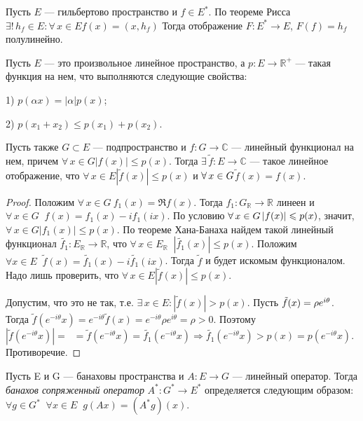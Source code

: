 \documentclass[10pt]{article}
\newcommand*{\p}[1]{#1\nobreak\discretionary{}{\hbox{$\mathsurround=0pt #1$}}{}}
\begin{document}
\begin{note}
Пусть $E$ --- гильбертово пространство и $f\in E^*$. По теореме
Рисса  $\exists!\,h_f\in E:\forall\,x\in E$\;\;$f(x)=(x,h_f)$ Тогда
отображение $F\colon E^*\rightarrow E$, $F(f)=h_f$ полулинейно.
\end{note}

\begin{theorem}
Пусть $E$ --- это произвольное линейное пространство, а $p\colon
E\to\mathbb{R}^+$ --- такая функция на нем, что выполняются
следующие свойства:

1\textup{)} $p(\alpha x)=|\alpha| p(x)$;

2\textup{)} $p(x_1+x_2)\leqslant p(x_1)+p(x_2)$.

Пусть также $G\subset E$ --- подпространство и $f\colon
G\to\mathbb{C}$ --- линейный функционал на нем, причем
$\forall\,x\in G$\;\;$|f(x)|\leqslant p(x)$. Тогда
$\exists\,\tilde{f}\colon E\to \mathbb{C}$ --- такое линейное
отображение, что $\forall\,x\in E$\;\;$|\tilde{f}(x)|\leqslant p(x)$
и $\forall\,x\p\in G$\;\;$\tilde{f}(x)=f(x)$.
\end{theorem}

\begin{proof}
Положим $\forall\, x\in G\ f_1(x)=\Re f(x)$. Тогда $f_1\colon
G_{\mathbb{R}}\rightarrow \mathbb{R}$ линеен и $\forall\, x \in
G\;\; f(x)=f_1(x)-if_1(ix)$. По условию $\forall\,x\p\in
G$\;\;$|f(x)|\p\leqslant p(x)$, значит, $\forall\,x\in
G$\;\;$|f_1(x)|\leqslant p(x)$. По теореме Хана-Банаха найдем такой
линейный функционал $\tilde{f_1}\colon E_{\mathbb{R}}\rightarrow
\mathbb{R}$, что $\forall\, x\in E_{\mathbb{R}}
\;\;|\tilde{f_1}(x)|\leqslant p(x)$. Положим $\forall x \in E\;\;
\tilde{f}(x)=\tilde{f_1}(x)-i\tilde{f_1}(ix)$. Тогда $\tilde{f}$ и
будет искомым функционалом. Надо лишь проверить, что $\forall\,x\in
E$\;\;$|\tilde{f}(x)|\leqslant p(x)$.

Допустим, что это не так, т.е. $\exists\, x\in E:
|\tilde{f}(x)|>p(x)$. Пусть $\tilde{f}(x)\p=\rho e^{i\theta}$. Тогда
$\tilde{f}(e^{-i\theta}x)=e^{-i\theta}\tilde{f}(x)=e^{-i\theta}\rho
e^{i\theta}=\rho>0$. Поэтому
$|\tilde{f}(e^{-i\theta}x)|=\;\;=\tilde{f}(e^{-i\theta}x)=\tilde{f_1}(e^{-i\theta}x)\Rightarrow
\tilde{f_1}(e^{-i\theta}x)>p(x)=p(e^{-i\theta}x)$. Противоречие.
\end{proof}

\begin{df}
Пусть E и G --- банаховы пространства и $A\colon E\rightarrow G$
--- линейный оператор. Тогда \emph{банахов сопряженный оператор} $A^*\colon
G^*\rightarrow E^*$ определяется следующим образом: $\forall g\in
G^* \;\;\forall x\in E \;\;g(Ax)=(A^*g)(x)$.
\end{df}
\end{document}
